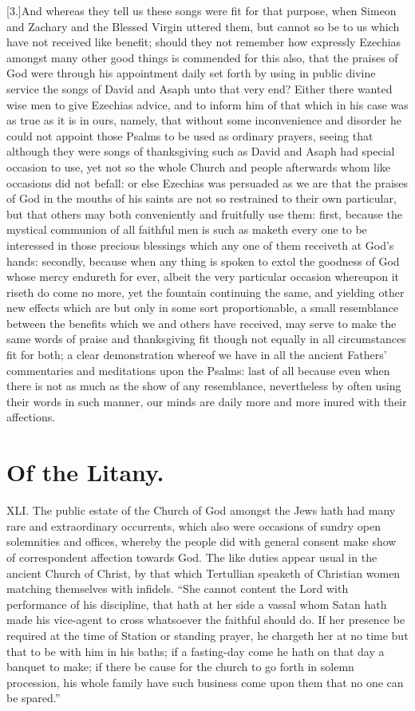[3.]And whereas they tell us these songs were fit for that purpose, when Simeon and Zachary and the Blessed Virgin uttered them, but cannot so be to us which have not received like benefit; should they not remember how expressly Ezechias amongst many other good things is commended for this also, that the praises of God were through his appointment daily set forth by using in public divine service the songs of David and Asaph unto that very end? Either there wanted wise men to give Ezechias advice, and to inform him of that which in his case was as true as it is in ours, namely, that without some inconvenience and disorder he could not appoint those Psalms to be used as ordinary prayers, seeing that although they were songs of thanksgiving such as David and Asaph had special occasion to use, yet not so the whole Church and people afterwards whom like occasions did not befall: or else Ezechias was persuaded as we are that the praises of God in the mouths of his saints are not so restrained to their own particular, but that others may both conveniently and fruitfully use them: first, because the mystical communion of all faithful men is such as maketh every one to be interessed in those precious blessings which any one of them receiveth at God’s hands: secondly, because when any thing is spoken to extol the goodness of God whose mercy endureth for ever, albeit the very particular occasion whereupon it riseth do come no more, yet the fountain continuing the same, and yielding other new effects which are but only in some sort proportionable, a small resemblance between the benefits which we and others have received, may serve to make the  same words of praise and thanksgiving fit though not equally in all circumstances fit for both;
 a clear demonstration whereof we have in all the ancient Fathers’ commentaries and meditations upon the Psalms: last of all because even when there is not as much as the show of any resemblance, nevertheless by often using their words in such manner, our minds are daily more and more inured with their affections.


\section*{Of the Litany.}
XLI. The public estate of the Church of God amongst the Jews hath had many rare and extraordinary occurrents, which also were occasions of sundry open solemnities and offices, whereby the people did with general consent make show of correspondent affection towards God. The like duties appear usual in the ancient Church of Christ, by that which Tertullian speaketh of Christian women matching themselves with infidels. “She cannot content the Lord with performance of his discipline, that hath at her side a vassal whom Satan hath made his vice-agent to cross whatsoever the faithful should do. If her presence be required at the time of Station or standing prayer, he chargeth her at no time  but that to be with him in his baths;
 if a fasting-day come he hath on that day a banquet to make; if there be cause for the church to go forth in solemn procession, his whole family have such business come upon them that no one can be spared.”

